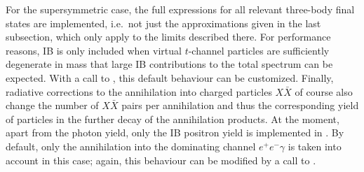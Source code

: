For the supersymmetric case, the 
full expressions for all relevant three-body final states are implemented, i.e.~not 
just the 
approximations given in the last subsection, which only apply to the limits 
described there.
For performance reasons, IB is only included when virtual $t$-channel particles 
are sufficiently degenerate in mass that large IB contributions to the total 
spectrum can be expected. With a call to  , this 
default
behaviour can be 
customized.
Finally, radiative corrections to the annihilation into charged particles $X\bar X$ 
of course also change the number of $X\bar X$ pairs per annihilation and thus the 
corresponding yield of particles in the further decay of the annihilation products. 
At the moment, apart from the photon yield, only the IB positron yield is 
implemented in \ds. By default, only the annihilation into the dominating channel $e^+e^-\gamma$ is taken into account in this case; again, this behaviour can be modified by a call to .


